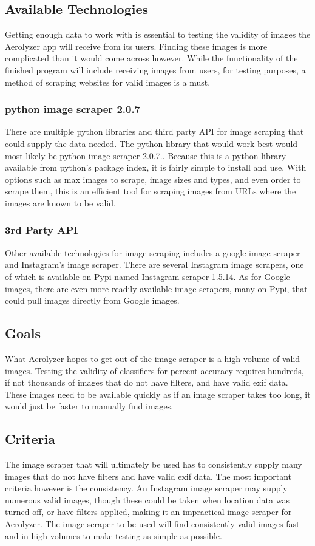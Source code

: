 \documentclass[onecolumn, draftclsnofoot,10pt, compsoc]{IEEEtran}
\begin{document}
\begin{singlespace}
\subsection{Available Technologies}
Getting enough data to work with is essential to testing the validity of images the Aerolyzer app will receive from its users. Finding these images is more complicated than it would come across however. While the functionality of the finished program will include receiving images from users, for testing purposes, a method of scraping websites for valid images is a must. \cite{img}

\subsubsection{python image scraper 2.0.7}
There are multiple python libraries and third party API for image scraping that could supply the data needed. The python library that would work best would most likely be python image scraper 2.0.7.. Because this is a python library available from python's package index, it is fairly simple to install and use. With options such as max images to scrape, image sizes and types, and even order to scrape them, this is an efficient tool for scraping images from URLs where the images are known to be valid.\cite{img}

\subsubsection{3rd Party API}
Other available technologies for image scraping includes a google image scraper and Instagram's image scraper. There are several Instagram image scrapers, one of which is available on Pypi named Instagram-scraper 1.5.14. As for Google images, there are even more readily available image scrapers, many on Pypi, that could pull images directly from Google images.\cite{img2}

\subsection{Goals}
What Aerolyzer hopes to get out of the image scraper is a high volume of valid images. Testing the validity of classifiers for percent accuracy requires hundreds, if not thousands of images that do not have filters, and have valid exif data. These images need to be available quickly as if an image scraper takes too long, it would just be faster to manually find images.

\subsection{Criteria}
The image scraper that will ultimately be used has to consistently supply many images that do not have filters and have valid exif data. The most important criteria however is the consistency. An Instagram image scraper may supply numerous valid images, though these could be taken when location data was turned off, or have filters applied, making it an impractical image scraper for Aerolyzer. The image scraper to be used will find consistently valid images fast and in high volumes to make testing as simple as possible.  



\end{singlespace}
\end{document}
